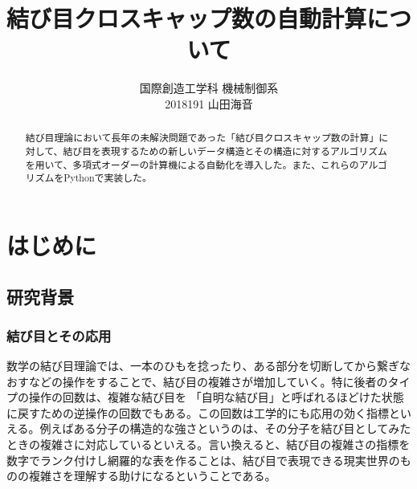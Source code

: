 \documentclass[11pt,a4j]{jarticle}
\title{結び目クロスキャップ数の自動計算について}
\author{国際創造工学科 機械制御系\\2018191 山田海音}
\date{} %
\begin{document}
\maketitle
\vspace{30mm}
\begin{abstract}
結び目理論において長年の未解決問題であった「結び目クロスキャップ数の計算」に対して、結び目を表現するための新しいデータ構造とその構造に対するアルゴリズムを用いて、多項式オーダーの計算機による自動化を導入した。また、これらのアルゴリズムをPythonで実装した。
\end{abstract}

\thispagestyle{empty}
\clearpage
\addtocounter{page}{-1}


\tableofcontents
\clearpage

\pagestyle{plain}
\lhead{\rightmark}

\section{はじめに}
\subsection{研究背景}
\subsubsection{結び目とその応用}
数学の結び目理論では、一本のひもを捻ったり、ある部分を切断してから繋ぎなおすなどの操作をすることで、結び目の複雑さが増加していく。特に後者のタイプの操作の回数は、複雑な結び目を
「自明な結び目」と呼ばれるほどけた状態に戻すための逆操作の回数でもある。この回数は工学的にも応用の効く指標といえる。例えばある分子の構造的な強さというのは、その分子を結び目としてみたときの複雑さに対応しているといえる。言い換えると、結び目の複雑さの指標を数字でランク付けし網羅的な表を作ることは、結び目で表現できる現実世界のものの複雑さを理解する助けになるということである。
\end{document}
